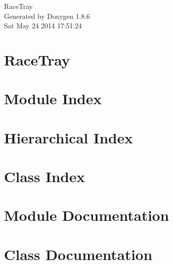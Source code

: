 \documentclass[twoside]{book}
\newcommand{\clearemptydoublepage}{%
  \newpage{\pagestyle{empty}\cleardoublepage}%
}
\begin{document}
\hypersetup{pageanchor=false}
\begin{titlepage}
\vspace*{7cm}
\begin{center}%
{\Large Race\-Tray }\\
\vspace*{1cm}
{\large Generated by Doxygen 1.8.6}\\
\vspace*{0.5cm}
{\small Sat May 24 2014 17:51:24}\\
\end{center}
\end{titlepage}
\clearemptydoublepage
\tableofcontents
\clearemptydoublepage
{}
\hypersetup{pageanchor=true}

\chapter{Race\-Tray}
\label{md__c_1__users__gael__documents__race_tray__r_e_a_d_m_e}
\hypertarget{md__c_1__users__gael__documents__race_tray__r_e_a_d_m_e}{}

\chapter{Module Index}

\chapter{Hierarchical Index}

\chapter{Class Index}

\chapter{Module Documentation}




\chapter{Class Documentation}





















\newpage
{}
{}
\printindex
\end{document}
